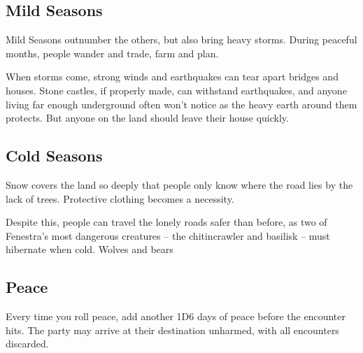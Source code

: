 \bigLine

\begin{multicols}{2}

\subsection{Mild Seasons}

Mild Seasons outnumber the others, but also bring heavy storms.
During peaceful months, people wander and trade, farm and plan.

When storms come, strong winds and earthquakes can tear apart bridges and houses.
Stone castles, if properly made, can withstand earthquakes, and anyone living far enough underground often won't notice as the heavy earth around them protects.
But anyone on the land should leave their house quickly.

\encMildVillages

\encMildEdge

\encMildForest

\bigLine

\begin{multicols}{2}

\subsection{Cold Seasons}

Snow covers the land so deeply that people only know where the road lies by the lack of trees.
Protective clothing becomes a necessity.

Despite this, people can travel the lonely roads safer than before, as two of Fenestra's most dangerous creatures -- the chitincrawler and basilisk -- must hibernate when cold.
Wolves and bears 

\encColdVillages

\encColdEdge

\encColdForest

\end{multicols}

\bigLine

\begin{multicols}{2}

\subsection{Peace}

Every time you roll peace, add another 1D6 days of peace before the encounter hits.
The party may arrive at their destination unharmed, with all encounters discarded.


\end{multicols}
\end{multicols}
